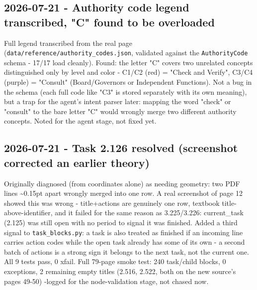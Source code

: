 \subsection*{2026-07-21 - Authority code legend transcribed, "C" found to be overloaded}
Full legend transcribed from the real page (\texttt{data/\allowbreak{}reference/\allowbreak{}authority\_\allowbreak{}codes.json}, validated against the \texttt{AuthorityCode} schema - 17/17 load cleanly). Found: the letter "C" covers two unrelated concepts distinguished only by level and color - C1/C2 (red) = "Check and Verify", C3/C4 (purple) = "Consult" (Board/Governors or Independent Functions). Not a bug in the schema (each full code like "C3" is stored separately with its own meaning), but a trap for the agent's intent parser later: mapping the word "check" or "consult" to the bare letter "C" would wrongly merge two different authority concepts. Noted for the agent stage, not fixed yet.

\subsection*{2026-07-21 - Task 2.126 resolved (screenshot corrected an earlier theory)}
Originally diagnosed (from coordinates alone) as needing geometry: two PDF lines \textasciitilde{}0.15pt apart wrongly merged into one row. A real screenshot of page 12 showed this was wrong - title+actions are genuinely one row, textbook title-above-identifier, and it failed for the same reason as 3.225/3.226: current\_task (2.125) was still open with no period to signal it was finished. Added a third signal to \texttt{task\_\allowbreak{}blocks.py}: a task is also treated as finished if an incoming line carries action codes while the open task already has some of its own - a second batch of actions is a strong sign it belongs to the next task, not the current one. All 9 tests pass, 0 xfail. Full 79-page smoke test: 240 task/child blocks, 0 exceptions, 2 remaining empty titles (2.516, 2.522, both on the new source's pages 49-50) -logged for the node-validation stage, not chased now.

